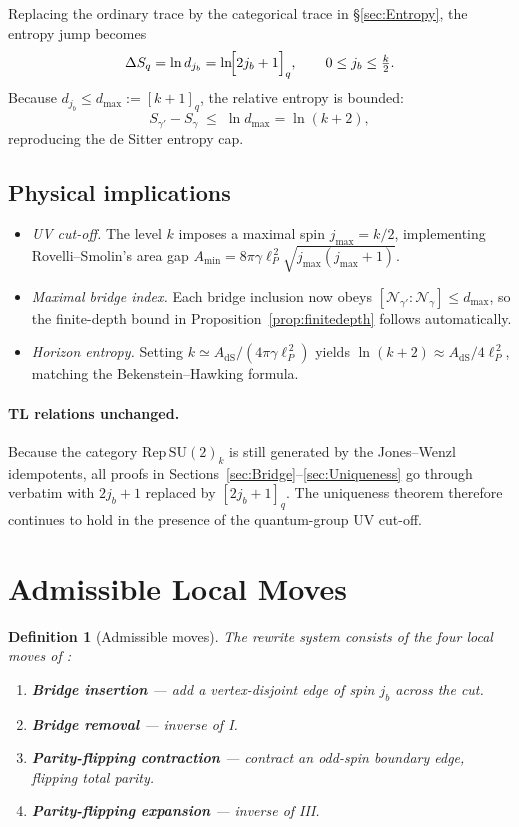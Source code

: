 \documentclass[11pt]{article}
\newtheorem{definition}{Definition}[section]
\begin{document}
Replacing the ordinary trace by the categorical trace in
\S\ref{sec:Entropy}, the entropy jump becomes
\[
  \Delta S_q
  =\ln d_{j_b}
  =\ln\!\Bigl[2j_b+1\Bigr]_q,
\qquad
  0\le j_b\le\tfrac{k}{2}.
\]
Because $d_{j_b}\le d_{\max}:=[k+1]_q$, the relative entropy is bounded:
\[
  S_{\gamma'}-S_{\gamma}
  \;\le\;
  \ln d_{\max}
  =\ln(k+2),
\]
reproducing the de Sitter entropy cap.

\subsection{Physical implications}

\begin{itemize}
\item \emph{UV cut-off.}  
  The level $k$ imposes a maximal spin $j_{\max}=k/2$, implementing
  Rovelli–Smolin’s area gap
  $A_{\min}=8\pi\gamma\ell_P^{\,2}\sqrt{j_{\max}(j_{\max}+1)}$.
\item \emph{Maximal bridge index.}  
  Each bridge inclusion now obeys
  $[\mathcal N_{\gamma'}:\mathcal N_{\gamma}]\le d_{\max}$,
  so the finite-depth bound in
  Proposition~\ref{prop:finitedepth} follows automatically.
\item \emph{Horizon entropy.}
  Setting $k\simeq A_{\text{dS}}/(4\pi\gamma\ell_P^{\,2})$ yields
  $\ln(k+2)\approx A_{\text{dS}}/4\ell_P^{\,2}$,
  matching the Bekenstein–Hawking formula.
\end{itemize}

\paragraph{TL relations unchanged.}
Because the category $\mathrm{Rep}\,\mathrm{SU}(2)_k$ is still generated
by the Jones–Wenzl idempotents,
all proofs in Sections~\ref{sec:Bridge}–\ref{sec:Uniqueness} go through
verbatim with $2j_b+1$ replaced by $[2j_b+1]_q$.
The uniqueness theorem therefore continues to hold in the presence of the
quantum-group UV cut-off.

\section{Admissible Local Moves}

\begin{definition}[Admissible moves]\label{def:moves}
The rewrite system consists of the four local moves of \cite{EntropyMono}:
\begin{enumerate}
\item[\textbf{I.}] \textbf{Bridge insertion} — add a vertex-disjoint edge of spin
      $j_b$ across the cut.
\item[\textbf{II.}] \textbf{Bridge removal} — inverse of I.
\item[\textbf{III.}] \textbf{Parity-flipping contraction} — contract an odd-spin
      boundary edge, flipping total parity.
\item[\textbf{IV.}] \textbf{Parity-flipping expansion} — inverse of III.
\end{enumerate}
\end{definition}
\end{document}
